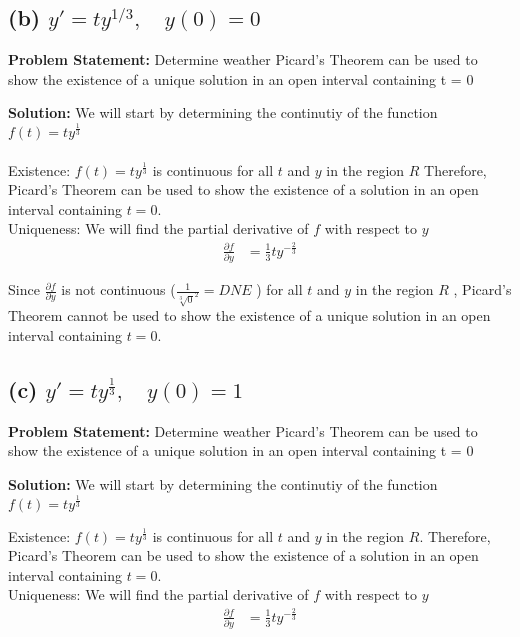 \documentclass[12pt, letterpaper]{article}
\begin{document}
\subsection*{(b) $y' = ty^{1/3}, \quad y(0) = 0$}
\textbf{Problem Statement:} Determine weather Picard's Theorem can be used to show the existence of a unique solution in an open interval containing t = 0

\textbf{Solution:} We will start by determining the continutiy of the function $f(t) = ty^{\frac{1}{3}}$ 
\paragraph*{}
Existence: $f(t) = ty^{\frac{1}{3}}$ is continuous for all $t$ and $y$ in the region $R$ Therefore, Picard's Theorem can be used to show the existence of a  solution in an open interval containing $t = 0$. \\

Uniqueness: We will find the partial derivative of $f$ with respect to $y$ \\
\begin{align*}
\frac{\partial f}{\partial y} &= \frac{1}{3}ty^{-\frac{2}{3}}
\end{align*}

Since $\frac{\partial f}{\partial y}$ is not continuous ($\frac{1}{\sqrt[3]{0}^2} = DNE$ ) for all $t$ and $y$ in the region $R$ , Picard's Theorem cannot be used to show the existence of a unique solution in an open interval containing $t = 0$.

\subsection*{(c) $y' = ty^{\frac{1}{3}}, \quad y(0) = 1$}
\textbf{Problem Statement:} Determine weather Picard's Theorem can be used to show the existence of a unique solution in an open interval containing t = 0

\textbf{Solution:} We will start by determining the continutiy of the function $f(t) = ty^{\frac{1}{3}}$

Existence: $f(t) = ty^{\frac{1}{3}}$ is continuous for all $t$ and $y$ in the region $R$. Therefore, Picard's Theorem can be used to show the existence of a  solution in an open interval containing $t = 0$. \\

Uniqueness: We will find  the partial derivative of $f$ with respect to $y$ \\
\begin{align*}
\frac{\partial f}{\partial y} &= \frac{1}{3}ty^{-\frac{2}{3}}
\end{align*}
\end{document}

